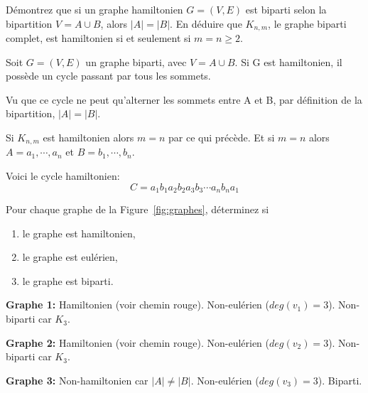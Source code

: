 \begin{exo}
D\'emontrez que si un graphe hamiltonien $G = (V,E)$ est biparti selon la bipartition $V = A \cup B$, alors $|A|= |B|$. En d\'eduire que $K_{n,m}$, le graphe biparti complet, est hamiltonien si et seulement si $m=n \geq 2$.

\end{exo}

Soit $G=(V,E)$ un graphe biparti, avec $V = A \cup B$. Si G est hamiltonien, il possède un cycle passant par tous les sommets.

Vu que ce cycle ne peut qu'alterner les sommets entre A et B, par définition de la bipartition, $|A| = |B|$.

Si $K_{n,m}$ est hamiltonien alors $m=n$ par ce qui précède. Et si $m=n$ alors $A={a_1, \cdots, a_n}$ et $B={b_1, \cdots, b_n}$.

Voici le cycle hamiltonien: $$ C = a_1 b_1 a_2 b_2 a_3 b_3 \cdots a_n b_n a_1 $$


\begin{exo}
Pour chaque graphe de la Figure~\ref{fig:graphes}, d\'eterminez si 
\begin{enumerate}
\item le graphe est hamiltonien,
\item le graphe est eul\'erien,
\item le graphe est biparti.
\end{enumerate}
\end{exo}




\textbf{Graphe 1:} Hamiltonien (voir chemin rouge). Non-eulérien ($deg(v_1)=3$). Non-biparti car $K_3$.

\textbf{Graphe 2:} Hamiltonien (voir chemin rouge). Non-eulérien ($deg(v_2)=3$). Non-biparti car $K_3$.

\textbf{Graphe 3:} Non-hamiltonien car $|A| \neq |B|$. Non-eulérien ($deg(v_3)=3$). Biparti.




